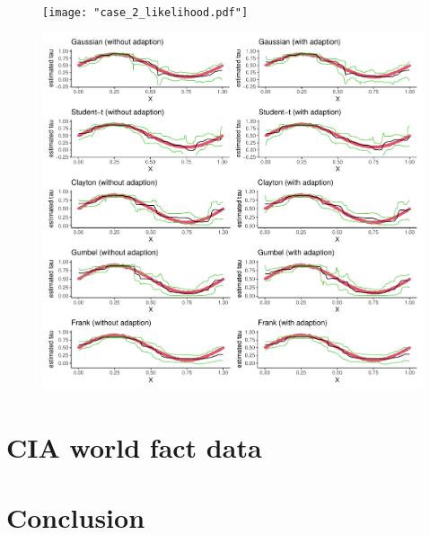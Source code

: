 \documentclass{amsart}
\begin{document}
\begin{figure}
	\centering
	\texttt{[image: "case\_2\_likelihood.pdf"]}
\end{figure}


\begin{figure}
	\centering
	\includegraphics[width = 0.95\linewidth]{"case_2_pred.pdf"}
\end{figure}



\section{CIA world fact data}\label{sec:cia}

\section{Conclusion}\label{sec:conc}




\end{document}
